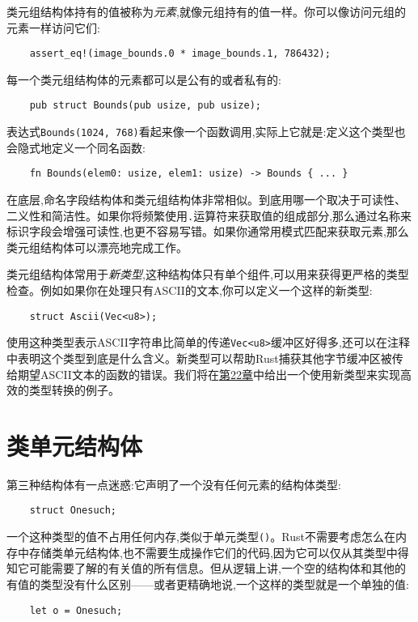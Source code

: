 类元组结构体持有的值被称为\emph{元素},就像元组持有的值一样。你可以像访问元组的元素一样访问它们:
\begin{verbatim}
    assert_eq!(image_bounds.0 * image_bounds.1, 786432);
\end{verbatim}

每一个类元组结构体的元素都可以是公有的或者私有的:
\begin{verbatim}
    pub struct Bounds(pub usize, pub usize);
\end{verbatim}

表达式\texttt{Bounds(1024, 768)}看起来像一个函数调用,实际上它就是:定义这个类型也会隐式地定义一个同名函数:
\begin{verbatim}
    fn Bounds(elem0: usize, elem1: usize) -> Bounds { ... }
\end{verbatim}

在底层,命名字段结构体和类元组结构体非常相似。到底用哪一个取决于可读性、二义性和简洁性。如果你将频繁使用\texttt{.}运算符来获取值的组成部分,那么通过名称来标识字段会增强可读性,也更不容易写错。如果你通常用模式匹配来获取元素,那么类元组结构体可以漂亮地完成工作。

类元组结构体常用于\emph{新类型},这种结构体只有单个组件,可以用来获得更严格的类型检查。例如如果你在处理只有ASCII的文本,你可以定义一个这样的新类型:
\begin{verbatim}
    struct Ascii(Vec<u8>);
\end{verbatim}

使用这种类型表示ASCII字符串比简单的传递\texttt{Vec<u8>}缓冲区好得多,还可以在注释中表明这个类型到底是什么含义。新类型可以帮助Rust捕获其他字节缓冲区被传给期望ASCII文本的函数的错误。我们将在\hyperref[ch22]{第22章}中给出一个使用新类型来实现高效的类型转换的例子。

\section{类单元结构体}

第三种结构体有一点迷惑:它声明了一个没有任何元素的结构体类型:
\begin{verbatim}
    struct Onesuch;
\end{verbatim}

一个这种类型的值不占用任何内存,类似于单元类型\texttt{()}。Rust不需要考虑怎么在内存中存储类单元结构体,也不需要生成操作它们的代码,因为它可以仅从其类型中得知它可能需要了解的有关值的所有信息。但从逻辑上讲,一个空的结构体和其他的有值的类型没有什么区别——或者更精确地说,一个这样的类型就是一个单独的值:
\begin{verbatim}
    let o = Onesuch;
\end{verbatim}

